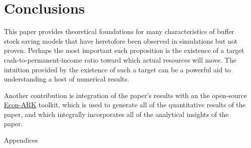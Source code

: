 \documentclass[titlepage]{\econtex}\providecommand{\texname}{BufferStockTheory}
\begin{document}
\hypertarget{Conclusions}{}
\section{Conclusions}

This paper provides theoretical foundations for many characteristics
of buffer stock saving models that have heretofore been observed in
simulations but not proven.  Perhaps the most important such
proposition is the existence of a target cash-to-permanent-income
ratio toward which actual resources will move.  The intuition provided by
the existence of such a target can be a powerful aid to understanding a host
of numerical results.

Another contribution is integration of the paper's results with an the open-source \href{https://econ-ark.org}{Econ-ARK} toolkit, which is used to generate all of the quantitative results of the paper, and which integrally incorporates all of the analytical insights of the paper.

\clearpage\vfill\eject

\appendix

\centerline{\LARGE Appendices}\vspace{0.2in}

\begin{comment}
\section{$\mRat$ Growth in the Perfect Foresight Model} \label{sec:mGrowthPF}

To see why the constraint is irrelevant if
\eqref{eq:PFGIC} fails, recall that for the unconstrained case when
both the FHWC and RIC hold the optimal solution is $\cLevBF_{t} =
(1-\PatR)(\mLevBF_{t}+\hLevBF_{t}-\pLevBF_{t})$, and that
$\cLevBF_{t+1} = {\Pat} \cLevBF_{t}$; combining these
we have
\begin{eqnarray*}
    \mLevBF_{t+1} & = & \Rfree(\mLevBF_{t}-\cLevBF_{t}) + \PGro \pLevBF_{t}\\
  & = & {\Pat}\mLevBF_{t} + \PGro \pLevBF_{t} - (1-\PatR)(\hLevBF_{t}-\pLevBF_{t}) \Rfree
\\ \mRat_{t+1}\PGro & = & {\Pat}\mRat_{t} + \bullet
\\ \mRat_{t+1} & = & \left(\frac{{\Pat}}{\PGro}\right)\mRat_{t} + \bullet/\PGro
\end{eqnarray*}
for some $\bullet$ which can be shown to be positive.
\end{comment}
\end{document}
